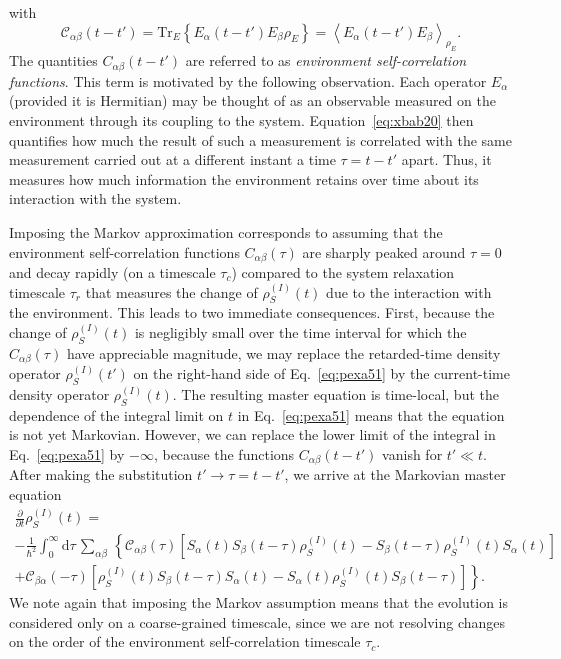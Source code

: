 \documentclass[3p,sort&compress,12pt]{elsarticle}
\newcommand{\D}{\ensuremath{\mathrm{d}}}
\newcommand{\op}[1]{#1}
\begin{document}
%
with
%
\begin{equation}
  \label{eq:xbab20}
\mathcal{C}_{\alpha\beta}(t-t') = \text{Tr}_E \left\{ \op{E}_\alpha(t-t')
    \op{E}_\beta \op{\rho}_E\right\} = \left\langle \op{E}_\alpha(t-t') \op{E}_\beta
  \right\rangle_{\op{\rho}_E}.
\end{equation}
%
The quantities $C_{\alpha\beta}(t-t')$ are referred to as \emph{environment self-correlation functions}. This term is motivated by the following observation. Each operator $\op{E}_\alpha$ (provided it is Hermitian) may be thought of as an observable measured on the environment through its coupling to the system. Equation~\eqref{eq:xbab20} then quantifies how much the result of such a measurement is correlated with the same measurement carried out at a different instant a time $\tau=t-t'$ apart. Thus, it measures how much information the environment retains over time about its interaction with the system. 

Imposing the Markov approximation corresponds to assuming that the environment self-correlation functions $C_{\alpha\beta}(\tau)$ are sharply peaked around $\tau = 0$ and decay rapidly (on a timescale $\tau_c$) compared to the system relaxation timescale $\tau_r$ that measures the change of $\op{\rho}^{(I)}_S(t)$ due to the interaction with the environment. This leads to two immediate consequences. First, because the change of $\op{\rho}^{(I)}_S(t)$ is negligibly small over the time interval for which the $C_{\alpha\beta}(\tau)$ have appreciable magnitude, we may replace the retarded-time density operator $\op{\rho}^{(I)}_S(t')$ on the right-hand side of Eq.~\eqref{eq:pexa51} by the current-time density operator $\op{\rho}^{(I)}_S(t)$. The resulting master equation is time-local, but the dependence of the integral limit on $t$ in Eq.~\eqref{eq:pexa51} means that the equation is not yet Markovian. However, we can replace the lower limit of the integral  in Eq.~\eqref{eq:pexa51} by $-\infty$, because the functions $C_{\alpha\beta}(t-t')$ vanish for $t' \ll t$. After making the substitution $t' \longrightarrow \tau = t-t'$, we arrive at the Markovian master equation
%
\begin{multline} 
\label{eq:pexarr} 
\frac{\partial}{\partial t}
\op{\rho}^{(I)}_S(t) =  \\ - \frac{1}{\hbar^2}\int_0^\infty \D \tau
\, \sum_{\alpha\beta} \, \left\{ \mathcal{C}_{\alpha\beta}(\tau) \left[
    \op{S}_\alpha(t) \op{S}_\beta(t-\tau) \op{\rho}^{(I)}_S(t)
    - \op{S}_\beta(t-\tau) \op{\rho}^{(I)}_S(t) \op{S}_\alpha(t)
  \right]\right. \\ \left. + \mathcal{C}_{\beta\alpha}(-\tau) \left[
    \op{\rho}^{(I)}_S(t)\op{S}_\beta(t-\tau)  \op{S}_\alpha(t)
    - \op{S}_\alpha(t)\op{\rho}^{(I)}_S(t)\op{S}_\beta(t-\tau)
  \right] \right\}.
\end{multline}
%
We note again that imposing the Markov assumption means that the evolution is considered only on a coarse-grained timescale, since we are not resolving changes on the order of the environment self-correlation timescale $\tau_c$. 
\end{document}
